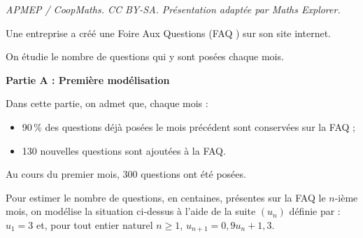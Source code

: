 \documentclass[10pt]{article}
\begin{document}
\noindent\textit{APMEP / CoopMaths. CC BY-SA. Présentation adaptée par Maths Explorer.}\par\medskip
\medskip

Une entreprise a créé une Foire Aux Questions (\og FAQ \fg) sur son site internet.



On étudie le nombre de questions qui y sont posées chaque mois.

\bigskip

\textbf{Partie A : Première modélisation}

\medskip

Dans cette partie, on admet que, chaque mois :

\begin{itemize}
\item[$\bullet~~$]90\,\% des questions déjà posées le mois précédent sont conservées sur la FAQ ;
\item[$\bullet~~$]130 nouvelles questions sont ajoutées à la FAQ.
\end{itemize}

Au cours du premier mois, $300$ questions ont été posées.



Pour estimer le nombre de questions, en centaines, présentes sur la FAQ le $n$-ième
mois, on modélise la situation ci-dessus à l'aide de la suite $\left(u_n\right)$ définie par : $u_1 =3$ et, pour tout entier naturel $n \geqslant 1$, $u_{n+1} = 0,9u_n + 1,3$.
\end{document}
